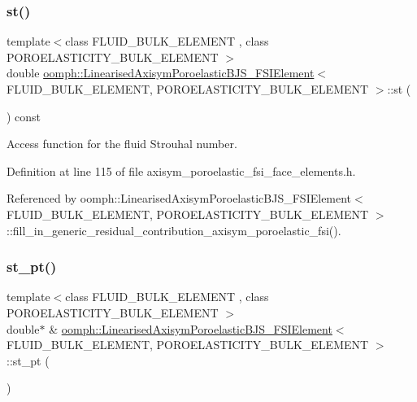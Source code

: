 \subsubsection{\texorpdfstring{st()}{st()}}
{\footnotesize\ttfamily template$<$class F\+L\+U\+I\+D\+\_\+\+B\+U\+L\+K\+\_\+\+E\+L\+E\+M\+E\+NT , class P\+O\+R\+O\+E\+L\+A\+S\+T\+I\+C\+I\+T\+Y\+\_\+\+B\+U\+L\+K\+\_\+\+E\+L\+E\+M\+E\+NT $>$ \\
double \hyperlink{classoomph_1_1LinearisedAxisymPoroelasticBJS__FSIElement}{oomph\+::\+Linearised\+Axisym\+Poroelastic\+B\+J\+S\+\_\+\+F\+S\+I\+Element}$<$ F\+L\+U\+I\+D\+\_\+\+B\+U\+L\+K\+\_\+\+E\+L\+E\+M\+E\+NT, P\+O\+R\+O\+E\+L\+A\+S\+T\+I\+C\+I\+T\+Y\+\_\+\+B\+U\+L\+K\+\_\+\+E\+L\+E\+M\+E\+NT $>$\+::st (\begin{DoxyParamCaption}{ }\end{DoxyParamCaption}) const\hspace{0.3cm}{\ttfamily [inline]}}



Access function for the fluid Strouhal number. 



Definition at line 115 of file axisym\+\_\+poroelastic\+\_\+fsi\+\_\+face\+\_\+elements.\+h.



Referenced by oomph\+::\+Linearised\+Axisym\+Poroelastic\+B\+J\+S\+\_\+\+F\+S\+I\+Element$<$ F\+L\+U\+I\+D\+\_\+\+B\+U\+L\+K\+\_\+\+E\+L\+E\+M\+E\+N\+T, P\+O\+R\+O\+E\+L\+A\+S\+T\+I\+C\+I\+T\+Y\+\_\+\+B\+U\+L\+K\+\_\+\+E\+L\+E\+M\+E\+N\+T $>$\+::fill\+\_\+in\+\_\+generic\+\_\+residual\+\_\+contribution\+\_\+axisym\+\_\+poroelastic\+\_\+fsi().

\mbox{\label{classoomph_1_1LinearisedAxisymPoroelasticBJS__FSIElement_a9b7727eac2aa2258eeebe923642dde68}} 
\subsubsection{\texorpdfstring{st\+\_\+pt()}{st\_pt()}}
{\footnotesize\ttfamily template$<$class F\+L\+U\+I\+D\+\_\+\+B\+U\+L\+K\+\_\+\+E\+L\+E\+M\+E\+NT , class P\+O\+R\+O\+E\+L\+A\+S\+T\+I\+C\+I\+T\+Y\+\_\+\+B\+U\+L\+K\+\_\+\+E\+L\+E\+M\+E\+NT $>$ \\
double$\ast$ \& \hyperlink{classoomph_1_1LinearisedAxisymPoroelasticBJS__FSIElement}{oomph\+::\+Linearised\+Axisym\+Poroelastic\+B\+J\+S\+\_\+\+F\+S\+I\+Element}$<$ F\+L\+U\+I\+D\+\_\+\+B\+U\+L\+K\+\_\+\+E\+L\+E\+M\+E\+NT, P\+O\+R\+O\+E\+L\+A\+S\+T\+I\+C\+I\+T\+Y\+\_\+\+B\+U\+L\+K\+\_\+\+E\+L\+E\+M\+E\+NT $>$\+::st\+\_\+pt (\begin{DoxyParamCaption}{ }\end{DoxyParamCaption})\hspace{0.3cm}{\ttfamily [inline]}}



